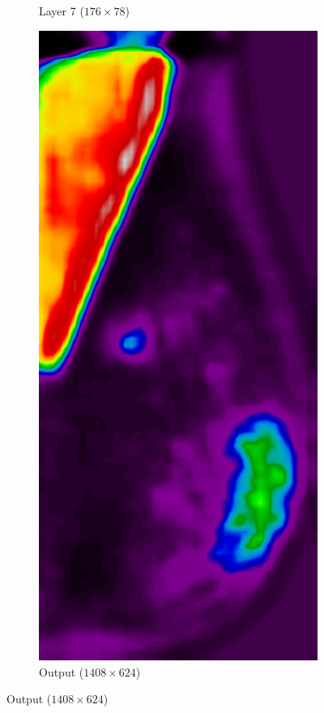 \documentclass{beamer}
\begin{document}
\begin{frame}
\begin{figure}
\begin{subfigure}{0.19\textwidth}
		        \caption{Layer 7 ($176 \times 78$)}
            \end{subfigure}
            \begin{subfigure}{0.19\textwidth}
		        \centering
			        \includegraphics[width=\textwidth]{plots/layer_9.png}
		        \caption{Output ($1408 \times 624$)}
            \end{subfigure}
        \end{figure}
	\end{frame}
\end{document}
